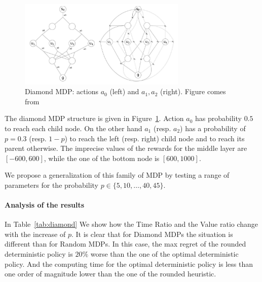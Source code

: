 \begin{figure}[h]
\begin{center}
\includegraphics[width=8cm]{images/diamond.png}
\end{center}
\caption{Diamond MDP: actions $a_0$ (left) and $a_1, a_2$ (right). Figure comes from \cite{benavent2018}}
\label{fig:diamond}
\end{figure}

The diamond MDP structure is given in Figure~\ref{fig:diamond}. Action $a_0$ has probability $0.5$ to reach each child node.  
On the other hand $a_1$ (resp. $a_2$) has a probability of $p= 0.3$ (resp. $1-p$) to reach the left (resp. right) child node and to reach its parent otherwise.
The imprecise values of the rewards for the middle layer are $[-600,600]$, while the one of the bottom node is $[600,1000]$.

We propose a generalization of this family of MDP by testing a range of parameters for the probability $p \in \{5,10,\dots,40,45\}$. %

\paragraph{Analysis of the results}
In Table~\ref{tab:diamond} We show how the Time Ratio and the Value ratio change with the increase of $p$.
It is clear that for Diamond MDPs the situation is different than for Random MDPs. In this case, the max regret of the rounded deterministic policy is $20\%$ worse than the one of the optimal deterministic policy. And the computing time for the optimal deterministic policy is less than one order of magnitude lower than the one of the rounded heuristic.


